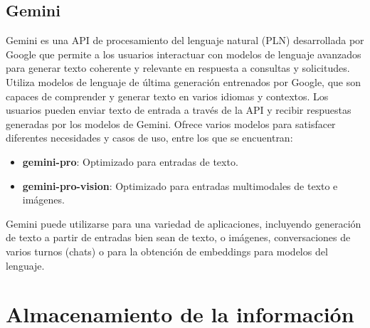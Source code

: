 \subsection{Gemini}


Gemini es una API de procesamiento del lenguaje natural (PLN) desarrollada por Google que permite a los usuarios interactuar con modelos de lenguaje avanzados para generar texto coherente y relevante en respuesta a consultas y solicitudes. Utiliza modelos de lenguaje de última generación entrenados por Google, que son capaces de comprender y generar texto en varios idiomas y contextos. Los usuarios pueden enviar texto de entrada a través de la API y recibir respuestas generadas por los modelos de Gemini. Ofrece varios modelos para satisfacer diferentes necesidades y casos de uso, entre los que se encuentran:
\begin{itemize}[label=$\bullet$, leftmargin=*]
	\item \textbf{gemini-pro}: Optimizado para entradas de texto.
	\item \textbf{gemini-pro-vision}: Optimizado para entradas multimodales de texto e imágenes.
\end{itemize}

Gemini puede utilizarse para una variedad de aplicaciones, incluyendo generación de texto a partir de entradas bien sean de texto, o imágenes, conversaciones de varios turnos (chats) o para la obtención de embeddings para modelos del lenguaje. 





\section{Almacenamiento de la información}	
